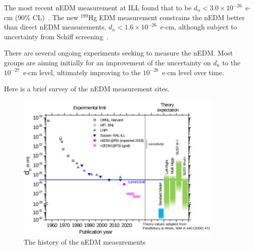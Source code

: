 The most recent nEDM measurement at ILL found that to be
$d_n< 3.0 \times 10^{-26}$~e$\cdot$cm (90\%
CL)~\cite{pendlebury2015revised}. The new $^{199}$Hg EDM measurement
constrains the nEDM better than direct nEDM measurements,
$d_n < 1.6 \times 10^{-26}$~e$\cdot$cm, although subject to
uncertainty from Schiff screening~\cite{graner2016reduced}.

There are several ongoing experiments seeking to measure the
nEDM. Most groups are aiming initially for an improvement of the
uncertainty on $d_n$ to the $10^{-27}$~e$\cdot$cm level, ultimately
improving to the $10^{-28}$~e$\cdot$cm level over time.


Here is a brief survey of the nEDM measurement sites.

\begin{figure}[h!]
  \centering
  \includegraphics[width=0.9\textwidth]{nEDMhistory.png}
  \caption{The history of the nEDM measurements~\cite{Bernhard_talk} }
  \label{fig:nEDMhistory}
\end{figure}

